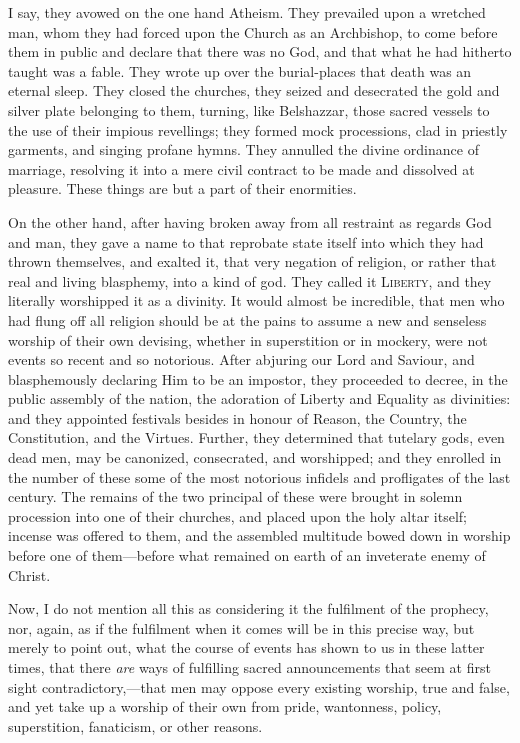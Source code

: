 I say, they avowed on the one hand Atheism. They prevailed upon a
wretched man, whom they had forced upon the Church as an Archbishop,
to come before them in public and declare that there was no God, and
that what he had hitherto taught was a fable. They wrote up over the
burial-places that death was an eternal sleep. They closed the
churches, they seized and desecrated the gold and silver plate
belonging to them, turning, like Belshazzar, those sacred vessels to
the use of their impious revellings; they formed mock processions,
clad in priestly garments, and singing profane hymns. They annulled
the divine ordinance of marriage, resolving it into a mere civil
contract to be made and dissolved at pleasure. These things are but a
part of their enormities.

On the other hand, after having broken away from all restraint as
regards God and man, they gave a name to that reprobate state itself
into which they had thrown themselves, and exalted it, that very
negation of religion, or rather that real and living blasphemy, into a
kind of god. They called it L\textsc{iberty}, and they literally worshipped it
as a divinity. It would almost be incredible, that men who had flung
off all religion should be at the pains to assume a new and senseless
worship of their own devising, whether in superstition or in mockery,
were not events so recent and so notorious. After abjuring our Lord
and Saviour, and blasphemously declaring Him to be an impostor, they
proceeded to decree, in the public assembly of the nation, the
adoration of Liberty and Equality as divinities: and they appointed
festivals besides in honour of Reason, the Country, the Constitution,
and the Virtues. Further, they determined that tutelary gods, even
dead men, may be canonized, consecrated, and worshipped; and they
enrolled in the number of these some of the most notorious infidels
and profligates of the last century. The remains of the two principal
of these were brought in solemn procession into one of their churches,
and placed upon the holy altar itself; incense was offered to them,
and the assembled multitude bowed down in worship before one of them—before
what remained on earth of an inveterate enemy of Christ.

Now, I do not mention all this as considering it the fulfilment of
the prophecy, nor, again, as if the fulfilment when it comes will be
in this precise way, but merely to point out, what the course of
events has shown to us in these latter times, that there \emph{are}
ways of fulfilling sacred announcements that seem at first sight
contradictory,—that men may oppose every existing worship, true and
false, and yet take up a worship of their own from pride, wantonness,
policy, superstition, fanaticism, or other reasons.

